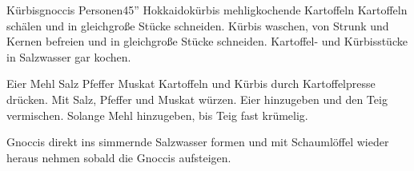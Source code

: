 \begin{MyRecipe}{Kürbisgnoccis}{ Personen}{45''}
	\ingredient[\Calc{0.5}{\x}]{\si{\kilogram}} {Hokkaidokürbis}
	\ingredient[\Calc{0.5}{\x}]{\si{\kilogram}} {mehligkochende Kartoffeln}
	Kartoffeln schälen und in gleichgroße Stücke schneiden. Kürbis waschen, von Strunk und Kernen befreien und in gleichgroße Stücke schneiden. Kartoffel- und Kürbisstücke in Salzwasser gar kochen.\par\bigskip
	
	\ingredient[\Calc{2}{\x}]{} {Eier}
	 {Mehl}
	\ingredient[]{} {Salz}
	\ingredient[]{} {Pfeffer}
	\ingredient[]{} {Muskat}
	Kartoffeln und Kürbis durch Kartoffelpresse drücken. Mit Salz, Pfeffer und Muskat würzen. Eier hinzugeben und den Teig vermischen. Solange Mehl hinzugeben, bis Teig fast krümelig.\par\bigskip
	
 	Gnoccis direkt ins simmernde Salzwasser formen und mit Schaumlöffel wieder heraus nehmen sobald die Gnoccis aufsteigen.
	
	
	
	
	
\end{MyRecipe}